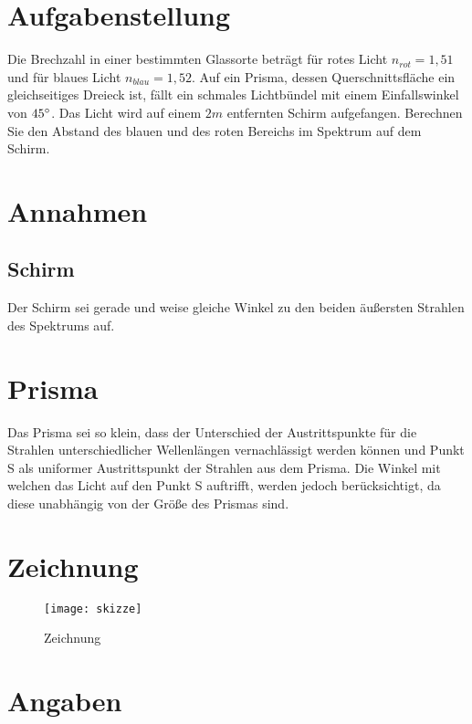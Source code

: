 \section*{Aufgabenstellung}

Die Brechzahl in einer bestimmten Glassorte beträgt für rotes Licht $n_{rot} = 1,51$ und für blaues Licht $n_{blau} = 1,52$. Auf ein Prisma, dessen Querschnittsfläche ein gleichseitiges Dreieck ist, fällt ein schmales Lichtbündel mit einem Einfallswinkel von $45 \degree$. Das Licht wird auf einem $2m$ entfernten Schirm aufgefangen. Berechnen Sie den Abstand des blauen und des roten Bereichs im Spektrum auf dem Schirm.



\section{Annahmen}

\subsection{Schirm}

Der Schirm sei gerade und weise gleiche Winkel zu den beiden äußersten Strahlen des Spektrums auf.

\section{Prisma}

Das Prisma sei so klein, dass der Unterschied der Austrittspunkte für die Strahlen unterschiedlicher Wellenlängen vernachlässigt werden können und Punkt S als uniformer Austrittspunkt der Strahlen aus dem Prisma. Die Winkel mit welchen das Licht auf den Punkt S auftrifft, werden jedoch berücksichtigt, da diese unabhängig von der Größe des Prismas sind.

\section{Zeichnung}	\label{sec:zeichnung}

\begin{figure}[ht!]
	\vspace{-15px}	
	\begin{center}
		\texttt{[image: skizze]}
		\caption{Zeichnung}
	\end{center}	
\end{figure}

\section{Angaben} \label{sec:Angaben}

